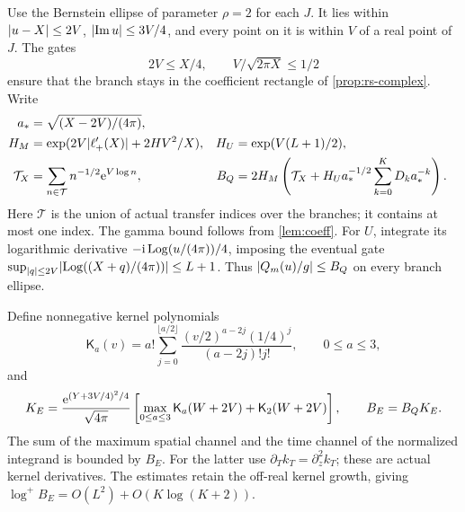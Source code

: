 Use the Bernstein ellipse of parameter \(\rho=2\) for each \(J\).
It lies within \(\lvert u-X\rvert\le2V\), \(\lvert \operatorname{Im} u\rvert\le3V/4\),
and every point on it is within \(V\) of a real point of \(J\).
The gates
\[
 2V\le X/4,\qquad V/\sqrt{2\pi X}\le1/2
\]
ensure that the branch stays in the coefficient rectangle of
\cref{prop:rs-complex}. Write
\begin{subequations}\label{eq:ellipse-data}
\begin{align}
 a_*&=\sqrt{(X-2V)/(4\pi)},\\
 H_M&=\exp(2V\lvert \ell_+'(X)\rvert+2HV^2/X),&
 H_U&=\exp(V(L+1)/2),\\
 \mathcal T_X&=\sum_{n\in\mathcal T}n^{-1/2}\mathrm e^{V\log n},&
 B_Q&=2H_M\left(\mathcal T_X+
                    H_Ua_*^{-1/2}\sum_{k=0}^KD_ka_*^{-k}\right).
\end{align}
\end{subequations}
Here \(\mathcal T\) is the union of actual transfer indices
over the branches; it contains at most one index.
The gamma bound follows from \cref{lem:coeff}.
For \(U\), integrate its logarithmic derivative
\(-\mathrm i\operatorname{Log}(u/(4\pi))/4\), imposing the eventual gate
\(\sup_{\lvert q\rvert\le2V}\lvert \operatorname{Log}((X+q)/(4\pi))\rvert\le L+1\).
Thus \(\lvert Q_m(u)/g\rvert\le B_Q\) on every branch ellipse.

Define nonnegative kernel polynomials
\[
 \mathsf K_a(v)=a!\sum_{j=0}^{\lfloor a/2\rfloor}
       \frac{(v/2)^{a-2j}(1/4)^j}{(a-2j)!j!},
 \qquad 0\le a\le3,
\]
and
\begin{equation}
 K_E=\frac{\mathrm e^{(Y+3V/4)^2/4}}{\sqrt{4\pi}}
       \left[\max_{0\le a\le3}\mathsf K_a(W+2V)
                       +\mathsf K_2(W+2V)\right],
 \qquad B_E=B_QK_E.
 \label{eq:ellipse-kernel}
\end{equation}
The sum of the maximum spatial channel and the time channel
of the normalized integrand is bounded by \(B_E\).
For the latter use \(\partial_Tk_T=\partial_z^2k_T\);
these are actual kernel derivatives.
The estimates retain the off-real kernel growth, giving
\(\log^+B_E=O(L^2)+O(K\log(K+2))\).

